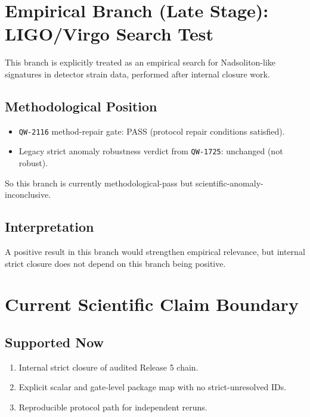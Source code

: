 \documentclass[11pt,a4paper]{article}
\newcommand{\QW}[1]{\texttt{QW-#1}}
\begin{document}
\section{Empirical Branch (Late Stage): LIGO/Virgo Search Test}
This branch is explicitly treated as an empirical search for Nadsoliton-like signatures in detector strain data, performed after internal closure work.

\subsection{Methodological Position}
\begin{itemize}[leftmargin=1.4em]
    \item \QW{2116} method-repair gate: PASS (protocol repair conditions satisfied).
    \item Legacy strict anomaly robustness verdict from \QW{1725}: unchanged (not robust).
\end{itemize}

So this branch is currently methodological-pass but scientific-anomaly-inconclusive.

\subsection{Interpretation}
A positive result in this branch would strengthen empirical relevance, but internal strict closure does not depend on this branch being positive.

\section{Current Scientific Claim Boundary}
\subsection{Supported Now}
\begin{enumerate}[leftmargin=1.5em]
    \item Internal strict closure of audited Release 5 chain.
    \item Explicit scalar and gate-level package map with no strict-unresolved IDs.
    \item Reproducible protocol path for independent reruns.
\end{enumerate}
\end{document}
